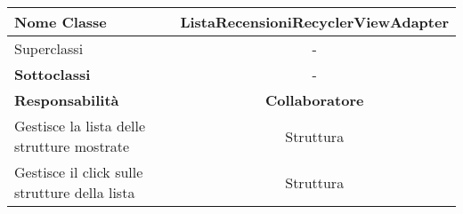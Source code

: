 
\setcounter{table}{0}
\begin{table}[H]
    \centering
    \begin{tabularx}{\textwidth}{||   X  ||  c   ||}
        \hline
        \rowcolor{Gray}
        \textbf{Nome Classe} & ListaRecensioniRecyclerViewAdapter\\
        \hline
        Superclassi  &  - \\
        \hline
        \textbf{Sottoclassi} & - \\
        \hline
         \textbf{Responsabilità} & \textbf{Collaboratore} \\
         \hline
          Gestisce la lista delle strutture mostrate & Struttura \\
         \hline
          Gestisce il click sulle strutture della lista & Struttura \\
         \hline
    \end{tabularx}
\end{table}
